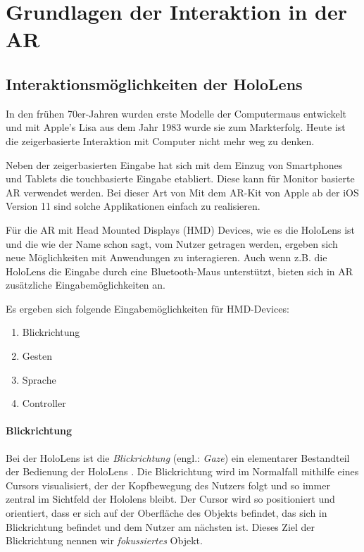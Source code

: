 \chapter{Grundlagen der Interaktion in der AR}
\label{ch:interaction-ar}

\section{Interaktionsmöglichkeiten der HoloLens}
\label{sec:interaction-hololens}

In den frühen 70er-Jahren wurden erste Modelle der Computermaus entwickelt und mit Apple's Lisa aus dem Jahr 1983 wurde sie zum Markterfolg. Heute ist die zeigerbasierte Interaktion mit Computer nicht mehr weg zu denken.

Neben der zeigerbasierten Eingabe hat sich mit dem Einzug von Smartphones und Tablets die touchbasierte Eingabe etabliert. Diese kann für Monitor basierte AR verwendet werden. Bei dieser Art von Mit dem AR-Kit von Apple ab der iOS Version 11 sind solche Applikationen einfach zu realisieren.

Für die AR mit Head Mounted Displays (HMD) Devices, wie es die HoloLens ist und die wie der Name schon sagt, vom Nutzer getragen werden, ergeben sich neue Möglichkeiten mit Anwendungen zu interagieren. Auch wenn z.B. die HoloLens die Eingabe durch eine Bluetooth-Maus unterstützt, bieten sich in AR zusätzliche Eingabemöglichkeiten an.

Es ergeben sich folgende Eingabemöglichkeiten für HMD-Devices:

\begin{enumerate}
  \item Blickrichtung
  \item Gesten
  \item Sprache
  \item Controller
\end{enumerate}

\subsubsection*{Blickrichtung}
Bei der HoloLens ist die \textit{Blickrichtung} (engl.: \textit{Gaze}) ein elementarer Bestandteil der Bedienung der HoloLens \cite{windows2017interaction}. Die Blickrichtung wird im Normalfall mithilfe eines Cursors visualisiert, der der Kopfbewegung des Nutzers folgt und so immer zentral im Sichtfeld der Hololens bleibt. Der Cursor wird so positioniert und orientiert, dass er sich auf der Oberfläche des Objekts befindet, das sich in Blickrichtung befindet und dem Nutzer am nächsten ist. Dieses Ziel der Blickrichtung nennen wir \textit{fokussiertes} Objekt.

